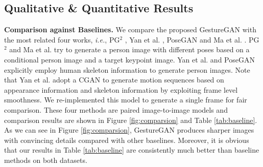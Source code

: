 \documentclass[sigconf]{acmart}
\begin{document}
\subsection{Qualitative \& Quantitative Results}
\noindent \textbf{Comparison against Baselines.}
We compare the proposed GestureGAN with the most related four works,
\textit{i.e.}, PG$^2$ \cite{ma2017pose}, Yan et al. \cite{yan2017skeleton}, PoseGAN \cite{siarohin2017deformable} and Ma et al. \cite{ma2017disentangled}.
PG$^2$ \cite{ma2017pose} and Ma et al. \cite{ma2017disentangled} try to generate a person image with different poses based on a conditional person image and a target keypoint image.
Yan et al. \cite{yan2017skeleton} and PoseGAN \cite{siarohin2017deformable} explicitly employ human skeleton information to generate person images.  
Note that Yan et al. \cite{yan2017skeleton} adopt a CGAN to generate motion sequences based on appearance information and skeleton information by exploiting frame level smoothness.
We re-implemented this model to generate a single frame for fair comparison. 
These four methods are paired image-to-image models and comparison results are shown in Figure \ref{fig:comparsion} and Table \ref{tab:baseline}.
As we can see in Figure \ref{fig:comparsion}, GestureGAN produces sharper images with convincing details compared with other baselines.
Moreover, it is obvious that our results in Table \ref{tab:baseline} are consistently much better than baseline methods on both datasets.
\end{document}
